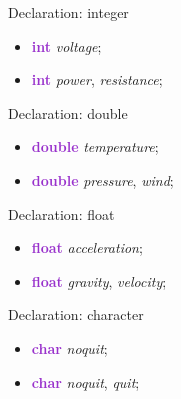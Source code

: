 \documentclass[xcolor={dvipsnames}]{beamer}
\begin{document}
\begin{frame}{Declaration: integer}
	\begin{itemize}
		\item \textcolor{DarkOrchid}{\textbf{int}} \textit{voltage};
		\item \textcolor{DarkOrchid}{\textbf{int}} \textit{power}, \textit{resistance};
	\end{itemize}
\end{frame}

\begin{frame}{Declaration: double}
	\begin{itemize}
		\item \textcolor{DarkOrchid}{\textbf{double}} \textit{temperature};
		\item \textcolor{DarkOrchid}{\textbf{double}} \textit{pressure}, \textit{wind};
	\end{itemize}
\end{frame}

\begin{frame}{Declaration: float}
	\begin{itemize}
		\item \textcolor{DarkOrchid}{\textbf{float}} \textit{acceleration};
		\item \textcolor{DarkOrchid}{\textbf{float}} \textit{gravity}, \textit{velocity};
	\end{itemize}
\end{frame}

\begin{frame}{Declaration: character}
	\begin{itemize}
		\item \textcolor{DarkOrchid}{\textbf{char}} \textit{no\textunderscore quit};
		\item \textcolor{DarkOrchid}{\textbf{char}} \textit{no\textunderscore quit}, \textit{quit};
	\end{itemize}
\end{frame}
\end{document}
